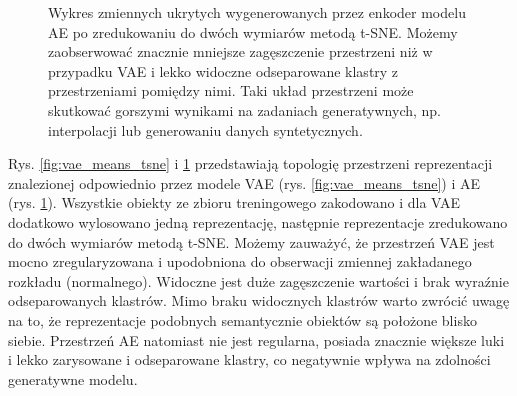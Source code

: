 \documentclass{iithesis}
\begin{document}
\begin{figure}
    \caption{\label{fig:ae_means_tsne} Wykres zmiennych ukrytych wygenerowanych przez enkoder modelu AE
    po zredukowaniu do dwóch wymiarów metodą t-SNE. Możemy zaobserwować znacznie mniejsze zagęszczenie
    przestrzeni niż w przypadku VAE i lekko widoczne odseparowane klastry z przestrzeniami pomiędzy nimi.
    Taki układ przestrzeni może skutkować gorszymi wynikami na zadaniach generatywnych, np. interpolacji
    lub generowaniu danych syntetycznych.}
\end{figure}

Rys. \ref{fig:vae_means_tsne} i \ref{fig:ae_means_tsne} przedstawiają topologię przestrzeni reprezentacji
znalezionej odpowiednio przez modele VAE (rys. \ref{fig:vae_means_tsne}) i AE (rys. \ref{fig:ae_means_tsne}).
Wszystkie obiekty ze zbioru treningowego zakodowano i dla VAE dodatkowo wylosowano jedną reprezentację,
następnie reprezentacje zredukowano do dwóch wymiarów metodą t-SNE.
Możemy zauważyć, że przestrzeń VAE jest mocno zregularyzowana i upodobniona do obserwacji
zmiennej zakładanego rozkładu (normalnego). Widoczne jest duże zagęszczenie wartości
i brak wyraźnie odseparowanych klastrów. Mimo braku widocznych klastrów warto
zwrócić uwagę na to, że reprezentacje podobnych semantycznie obiektów są położone blisko siebie.
Przestrzeń AE natomiast nie jest regularna, posiada znacznie większe luki i lekko
zarysowane i odseparowane klastry, co negatywnie wpływa na zdolności generatywne modelu.
\end{document}
